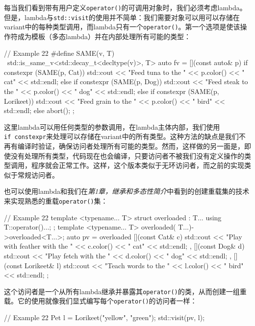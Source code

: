 \begin{code}
{每当我们看到带有用户定义\texttt{operator()}的可调用对象时，我们必须考虑lambda。但是，lambda与\texttt{std::visit}的使用并不简单：我们需要对象可以用可以存储在variant中的每种类型调用，而lambda只有一个\texttt{operator()}。第一个选项是使该操作符成为模板（多态lambda）并在内部处理所有可能的类型：

\begin{code}
// Example 22
#define SAME(v, T) \
  std::is_same_v<std::decay_t<decltype(v)>, T>
auto fv = [](const auto& p) {
  if constexpr (SAME(p, Cat)) {
    std::cout << "Feed tuna to the " << p.color()
              << " cat" << std::endl; }
  else if constexpr (SAME(p, Dog)) {
    std::cout << "Feed steak to the " << p.color()
              << " dog" << std::endl; }
  else if constexpr (SAME(p, Lorikeet)) {
    std::cout << "Feed grain to the " << p.color()
              << " bird" << std::endl; }
  else abort();
};
\end{code}

这里lambda可以用任何类型的参数调用，在lambda主体内部，我们使用\texttt{if\ constexpr}来处理可以存储在variant中的所有类型。这种方法的缺点是我们不再有编译时验证，确保访问者处理所有可能的类型。然而，这样做的另一面是，即使没有处理所有类型，代码现在也会编译，只要访问者不被我们没有定义操作的类型调用，程序就会正常工作。这样，这个版本类似于无环访问者，而之前的实现类似于常规访问者。

也可以使用lambda和我们在\emph{第1章，继承和多态性简介}中看到的创建重载集的技术来实现熟悉的重载\texttt{operator()}集：

\begin{code}
// Example 22
template <typename... T> struct overloaded : T... {
  using T::operator()...;
};
template <typename... T>
overloaded( T...)->overloaded<T...>;
auto pv = overloaded {
  [](const Cat& c) {
    std::cout << "Play with feather with the " << c.color()
              << " cat" << std::endl; },
  [](const Dog& d) {
    std::cout << "Play fetch with the " << d.color()
              << " dog" << std::endl; },
  [](const Lorikeet& l) {
    std::cout << "Teach words to the " << l.color()
              << " bird" << std::endl; }
};
\end{code}

这个访问者是一个从所有lambda继承并暴露其\texttt{operator()}的类，从而创建一组重载。它的使用就像我们显式编写每个\texttt{operator()}的访问者一样：

\begin{code}
// Example 22
Pet l = Lorikeet("yellow", "green");
std::visit(pv, l);
\end{code}

}
\end{code}

